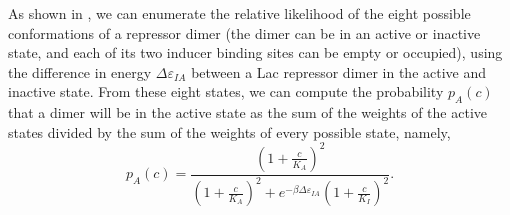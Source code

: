 As shown in \fref[figrepressorInducerStates], we can enumerate the relative
likelihood of the eight possible conformations of a repressor dimer (the dimer
can be in an active or inactive state, and each of its two inducer binding sites
can be empty or occupied), using the difference in energy $\Delta \varepsilon_{IA}$ between a
Lac repressor dimer in the active and inactive state. From these eight states, we can
compute the probability \(p_A(c)\) that a dimer will be in the active state
as the sum of the weights of the active states divided by the sum of the weights
of every possible state, namely,
\begin{equation}\label{eq6}
p_A(c)=\frac{\left(1+\frac{c}{K_A}\right)^2}{\left(1+\frac{c}{K_A}\right)^2+e^{-\beta  \Delta \varepsilon_{IA} }\left(1+\frac{c}{K_I}\right)^2}.
\end{equation}
